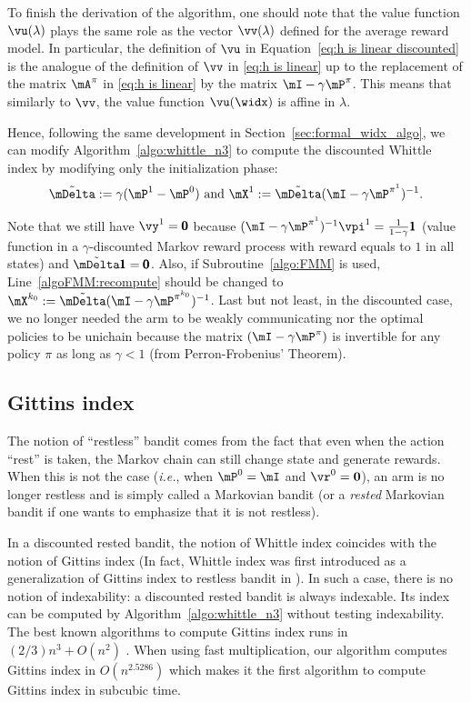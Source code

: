 To finish the derivation of the algorithm, one should note that the value function $\vu(\lambda)$ plays the same role as the vector $\vv(\lambda)$ defined for the average reward model.
In particular, the definition of $\vu$ in Equation~\eqref{eq:h is linear discounted} is the analogue of the definition of $\vv$ in \eqref{eq:h is linear} up to the replacement of the matrix $\mA^\pi$ in \eqref{eq:h is linear} by the matrix $\mI-\gamma \mP^\pi$.
This means that similarly to $\vv$, the value function $\vu(\widx)$ is affine in $\lambda$.

Hence, following the same development in Section~\ref{sec:formal_widx_algo}, we can modify Algorithm~\ref{algo:whittle_n3} to compute the discounted Whittle index by modifying only the initialization phase:
\begin{align*}
    \tilde{\mDelta}:=\gamma(\mP^1-\mP^0) \text{ and } \mX^1:=\tilde{\mDelta}(\mI-\gamma \mP^{\pi^1})^{-1}.
\end{align*}

Note that we still have $\vy^1=\pmb{0}$ because $(\mI-\gamma \mP^{\pi^1})^{-1}\vpi^1=\frac1{1-\gamma}\pmb{1}$ (value function in a $\gamma$-discounted Markov reward process with reward equals to $1$ in all states) and $\tilde{\mDelta}\pmb{1}=\pmb{0}$. Also, if Subroutine~\ref{algo:FMM} is used, Line~\ref{algoFMM:recompute} should be changed to $\mX^{k_0}:=\tilde{\mDelta}(\mI-\gamma \mP^{\pi^{k_0}})^{-1}$. Last but not least, in the discounted case, we no longer needed the arm to be weakly communicating nor the optimal policies to be unichain because the matrix $(\mI-\gamma \mP^\pi)$ is invertible for any policy $\pi$ as long as $\gamma<1$ (from Perron-Frobenius' Theorem).

\subsection{Gittins index}

The notion of ``restless'' bandit comes from the fact that even when the action ``rest'' is taken, the Markov chain can still change state and generate rewards. When this is not the case (\emph{i.e.}, when $\mP^0=\mI$ and $\vr^0=\boldsymbol{0}$), an arm is no longer restless and is simply called a Markovian bandit (or a \emph{rested} Markovian bandit if one wants to emphasize that it is not restless).

In a discounted rested bandit, the notion of Whittle index coincides with the notion of Gittins index (In fact, Whittle index was first introduced as a generalization of Gittins index to restless bandit in \cite{whittle1988restless}). In such a case, there is no notion of indexability: a discounted rested bandit is always indexable. Its index can be computed by Algorithm~\ref{algo:whittle_n3} without testing indexability. The best known algorithms to compute Gittins index runs in $(2/3) n^3 +O(n^2)$ \cite{chakravorty2014multi}. When using fast multiplication, our algorithm computes Gittins index in $O(n^{2.5286})$ which makes it the first algorithm to compute Gittins index in subcubic time.  

